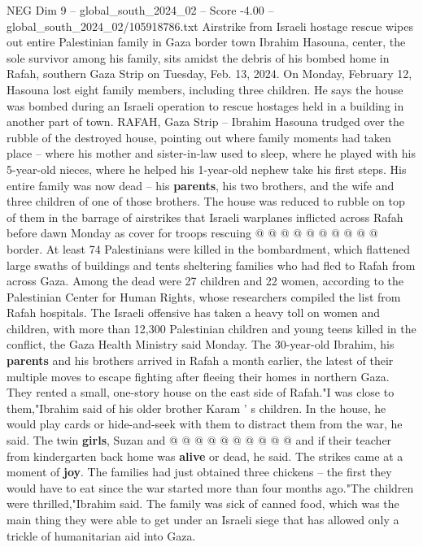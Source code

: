 \begin{textsample}{NEG Dim 9 – global\_south\_2024\_02 – Score -4.00 – global\_south\_2024\_02/105918786.txt}  \label{ex:f9_neg_347}
Airstrike from Israeli hostage rescue wipes out entire Palestinian family in Gaza border town Ibrahim Hasouna, center, the sole survivor among his family, sits amidst the debris of his bombed home in Rafah, southern Gaza Strip on Tuesday, Feb. 13, 2024.
On Monday, February 12, Hasouna lost eight family members, including three children.
He says the house was bombed during an Israeli operation to rescue hostages held in a building in another part of town.
RAFAH, Gaza Strip -- Ibrahim Hasouna trudged over the rubble of the destroyed house, pointing out where family moments had taken place -- where his mother and sister-in-law used to sleep, where he played with his 5-year-old nieces, where he helped his 1-year-old nephew take his first steps.
His entire family was now dead -- his \textbf{parents}, his two brothers, and the wife and three children of one of those brothers.
The house was reduced to rubble on top of them in the barrage of airstrikes that Israeli warplanes inflicted across Rafah before dawn Monday as cover for troops rescuing @ @ @ @ @ @ @ @ @ @ border.
At least 74 Palestinians were killed in the bombardment, which flattened large swaths of buildings and tents sheltering families who had fled to Rafah from across Gaza.
Among the dead were 27 children and 22 women, according to the Palestinian Center for Human Rights, whose researchers compiled the list from Rafah hospitals.
The Israeli offensive has taken a heavy toll on women and children, with more than 12,300 Palestinian children and young teens killed in the conflict, the Gaza Health Ministry said Monday.
The 30-year-old Ibrahim, his \textbf{parents} and his brothers arrived in Rafah a month earlier, the latest of their multiple moves to escape fighting after fleeing their homes in northern Gaza.
They rented a small, one-story house on the east side of Rafah."I was close to them,"Ibrahim said of his older brother Karam ' s children.
In the house, he would play cards or hide-and-seek with them to distract them from the war, he said.
The twin \textbf{girls}, Suzan and @ @ @ @ @ @ @ @ @ @ and if their teacher from kindergarten back home was \textbf{alive} or dead, he said.
The strikes came at a moment of \textbf{joy}.
The families had just obtained three chickens -- the first they would have to eat since the war started more than four months ago."The children were thrilled,"Ibrahim said.
The family was sick of canned food, which was the main thing they were able to get under an Israeli siege that has allowed only a trickle of humanitarian aid into Gaza.

\end{textsample}
